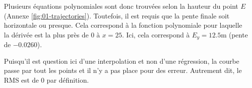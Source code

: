 Plusieurs équations polynomiales sont donc trouvées selon la hauteur du point
$E$ (Annexe \ref{fig:01-trajectories}). Toutefois, il est requis que la pente
finale soit horizontale ou presque. Cela correspond à la fonction polynomiale
pour laquelle la dérivée est la plus près de 0 à $x=25$. Ici, cela correspond à
$E_y=12.5$m (pente de $-0.0260$).

Puisqu'il est question ici d'une interpolation et non d'une régression, la
courbe passe par tout les points et il n'y a pas place pour des erreur. Autrement
dit, le RMS est de 0 par définition.\\

